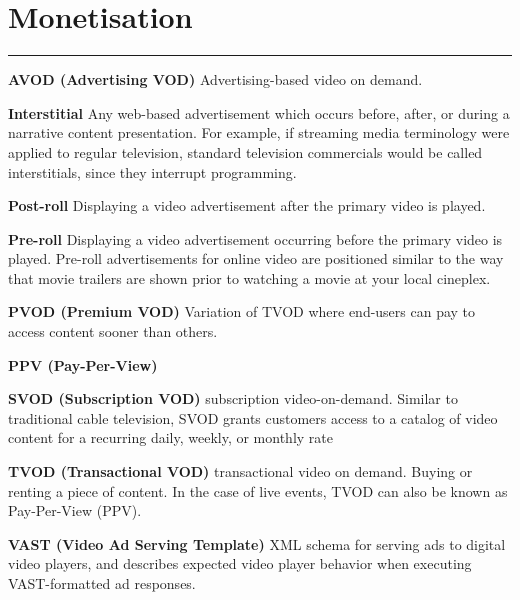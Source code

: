 
\section{Monetisation}
\hrule
\medskip
\textbf{AVOD (Advertising VOD)}
Advertising-based video on demand.

\smallskip
\textbf{Interstitial}
Any web-based advertisement which occurs before, after, or during a narrative content presentation. For example, if streaming media terminology were applied to regular television, standard television commercials would be called interstitials, since they interrupt programming.

\smallskip
\textbf{Post-roll}
Displaying a video advertisement after the primary video is played.

\smallskip
\textbf{Pre-roll}
Displaying a video advertisement occurring before the primary video is played. Pre-roll advertisements for online video are positioned similar to the way that movie trailers are shown prior to watching a movie at your local cineplex.

\smallskip
\textbf{PVOD (Premium VOD)}
Variation of TVOD where end-users can pay to access content sooner than others.

\smallskip
\textbf{PPV (Pay-Per-View)}

\smallskip
\textbf{SVOD (Subscription VOD)}
subscription video-on-demand. Similar to traditional cable television, SVOD grants customers access to a catalog of video content for a recurring daily, weekly, or monthly rate

\smallskip
\textbf{TVOD (Transactional VOD)}
transactional video on demand. Buying or renting a piece of content. In the case of live events, TVOD can also be known as Pay-Per-View (PPV).

\smallskip
\textbf{VAST (Video Ad Serving Template)}
XML schema for serving ads to digital video players, and describes expected video player behavior when executing VAST-formatted ad responses.
